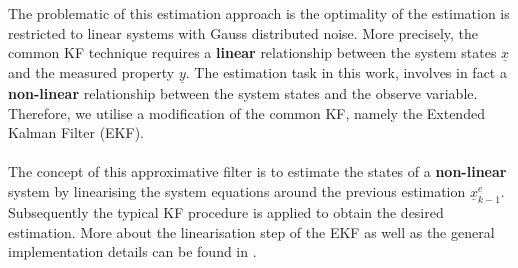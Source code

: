 \documentclass[english]{isasthesis}
\begin{document}
	The problematic of this estimation approach is the optimality of the estimation is restricted to linear systems with Gauss distributed noise. More precisely, the common KF technique requires a \textbf{linear} relationship between the system states $\underline{x}$ and the measured property $\underline{y}$. The estimation task in this work, involves in fact a \textbf{non-linear} relationship between the system states and the observe variable. Therefore, we utilise a modification of the common KF, namely the Extended Kalman Filter (EKF). \\ \\
	 The concept of this approximative filter is to estimate the states of a \textbf{non-linear} system by linearising the system equations around the previous estimation $\underline{x}_{k-1}^{e}$. Subsequently the typical KF procedure is applied to obtain the desired estimation. More about the linearisation step of the EKF as well as the general implementation details can be found in \cite{simon2006optimal}.
\end{document}
